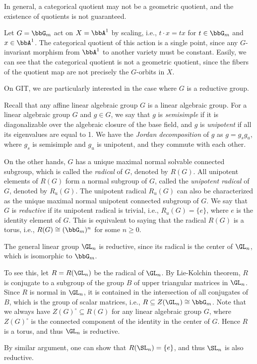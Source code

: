 In general, a categorical quotient may not be a geometric quotient, and the existence of quotients is not guaranteed.
\begin{example}
	Let $G = \bbG_m$ act on $X = \bbA^1$ by scaling, i.e., $t \cdot x = tx$ for $t \in \bbG_m$ and $x \in \bbA^1$.
	The categorical quotient of this action is a single point, since any $G$-invariant morphism from $\bbA^1$ to another variety must be constant.
	Easily, we can see that the categorical quotient is not a geometric quotient, since the fibers of the quotient map are not precisely the $G$-orbits in $X$.
\end{example}

On GIT, we are particularly interested in the case where $G$ is a reductive group.

Recall that any affine linear algebraic group $G$ is a linear algebraic group.
For a linear algebraic group $G$ and $g \in G$, we say that $g$ is \emph{semisimple} if it is diagonalizable over the algebraic closure of the base field, and $g$ is \emph{unipotent} if all its eigenvalues are equal to 1.
We have the \emph{Jordan decomposition} of $g$ as $g = g_s g_u$, where $g_s$ is semisimple and $g_u$ is unipotent, and they commute with each other.

On the other hands, $G$ has a unique maximal normal solvable connected subgroup, which is called the \emph{radical} of $G$, denoted by $R(G)$.
All unipotent elements of $R(G)$ form a normal subgroup of $G$, called the \emph{unipotent radical} of $G$, denoted by $R_u(G)$.
The unipotent radical $R_u(G)$ can also be characterized as the unique maximal normal unipotent connected subgroup of $G$.
We say that $G$ is \emph{reductive} if its unipotent radical is trivial, i.e., $R_u(G) = \{e\}$, where $e$ is the identity element of $G$.
This is equivalent to saying that the radical $R(G)$ is a torus, i.e., $R(G) \cong (\bbG_m)^n$ for some $n \geq 0$.

\begin{example}
	The general linear group $\GL_n$ is reductive, since its radical is the center of $\GL_n$, which is isomorphic to $\bbG_m$.

	To see this, let $R = R(\GL_n)$ be the radical of $\GL_n$.
	By Lie-Kolchin theorem, $R$ is conjugate to a subgroup of the group $B$ of upper triangular matrices in $\GL_n$.
	Since $R$ is normal in $\GL_n$, it is contained in the intersection of all conjugates of $B$, which is the group of scalar matrices, i.e., $R \subseteq Z(\GL_n) \cong \bbG_m$.
	Note that we always have $Z(G)^\circ \subseteq R(G)$ for any linear algebraic group $G$, where $Z(G)^\circ$ is the connected component of the identity in the center of $G$.
	Hence $R$ is a torus, and thus $\GL_n$ is reductive.

	By similar argument, one can show that $R(\SL_n) = \{e\}$, and thus $\SL_n$ is also reductive.
\end{example}


